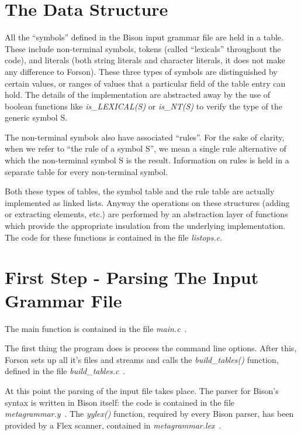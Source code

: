 \documentclass[a4paper,12pt]{article}
\begin{document}
\section{The Data Structure}

All the ``symbols'' defined in the Bison input grammar file are held in a table. These include non-terminal symbols, tokens (called ``lexicals'' throughout the code), and literals (both string literals and character literals, it does not make any difference to Forson). These three types of symbols are distinguished by certain values, or ranges of values that a particular field of the table entry can hold. The details of the implementation are abstracted away by the use of boolean functions like \emph{is\_LEXICAL(S)} or \emph{is\_NT(S)} to verify the type of the generic symbol S.

The non-terminal symbols also have associated ``rules''.
For the sake of clarity, when we refer to ``the rule of a symbol S'', we mean a single rule alternative of which the non-terminal symbol S is the result. Information on rules is held in a separate table for every non-terminal symbol.

Both these types of tables, the symbol table and the rule table are actually implemented as linked lists. Anyway the operations on these structures (adding or extracting elements, etc.) are performed by an abstraction layer of functions which provide the appropriate insulation from the underlying implementation. The code for these functions is contained in the file \emph{listops.c}.



\section{First Step - Parsing The Input Grammar File}

The main function is contained in the file \emph{main.c}\ .

The first thing the program does is process the command line options. After this, Forson sets up all it's files and streams and calls the \emph{build\_tables()} function, defined in the file \emph{build\_tables.c}\ .

At this point the parsing of the input file takes place. The parser for Bison's syntax is written in Bison itself: the code is contained in the file \emph{metagrammar.y}\ . The \emph{yylex()} function, required by every Bison parser, has been provided by a Flex scanner, contained in \emph{metagrammar.lex}\ .
\end{document}
